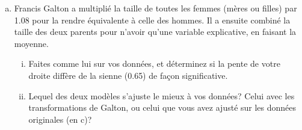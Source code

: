 \documentclass[letter, 11pt]{article}
\begin{document}
\begin{enumerate}[(a)]
\item Francis Galton a multiplié la taille de toutes les femmes (mères ou filles) par 1.08 pour la rendre équivalente à celle des hommes. Il a ensuite combiné la taille des deux parents pour n'avoir qu'une variable explicative, en faisant la moyenne. 
    \begin{enumerate}[(i)]
    \item  Faites comme lui sur vos données, et déterminez si la pente de votre droite diffère de la sienne (0.65) de façon significative.
    \item Lequel des deux modèles s'ajuste le mieux à vos données? Celui avec les transformations de Galton, ou celui que vous avez ajusté sur les données originales (en c)?
    \end{enumerate}

\end{enumerate}




\end{document}

